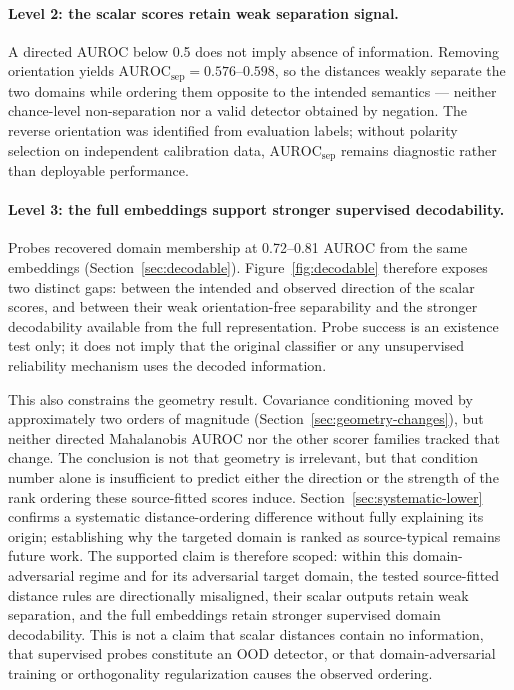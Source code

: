 \paragraph{Level 2: the scalar scores retain weak separation signal.}
A directed AUROC below 0.5 does not imply absence of information. Removing orientation yields $\mathrm{AUROC}_{\mathrm{sep}}=0.576$--$0.598$, so the distances weakly separate the two domains while ordering them opposite to the intended semantics --- neither chance-level non-separation nor a valid detector obtained by negation. The reverse orientation was identified from evaluation labels; without polarity selection on independent calibration data, $\mathrm{AUROC}_{\mathrm{sep}}$ remains diagnostic rather than deployable performance.

\paragraph{Level 3: the full embeddings support stronger supervised decodability.}
Probes recovered domain membership at 0.72--0.81 AUROC from the same embeddings (Section~\ref{sec:decodable}). Figure~\ref{fig:decodable} therefore exposes two distinct gaps: between the intended and observed direction of the scalar scores, and between their weak orientation-free separability and the stronger decodability available from the full representation. Probe success is an existence test only; it does not imply that the original classifier or any unsupervised reliability mechanism uses the decoded information.

This also constrains the geometry result. Covariance conditioning moved by approximately two orders of magnitude (Section~\ref{sec:geometry-changes}), but neither directed Mahalanobis AUROC nor the other scorer families tracked that change. The conclusion is not that geometry is irrelevant, but that condition number alone is insufficient to predict either the direction or the strength of the rank ordering these source-fitted scores induce. Section~\ref{sec:systematic-lower} confirms a systematic distance-ordering difference without fully explaining its origin; establishing why the targeted domain is ranked as source-typical remains future work. The supported claim is therefore scoped: within this domain-adversarial regime and for its adversarial target domain, the tested source-fitted distance rules are directionally misaligned, their scalar outputs retain weak separation, and the full embeddings retain stronger supervised domain decodability. This is not a claim that scalar distances contain no information, that supervised probes constitute an OOD detector, or that domain-adversarial training or orthogonality regularization causes the observed ordering.

